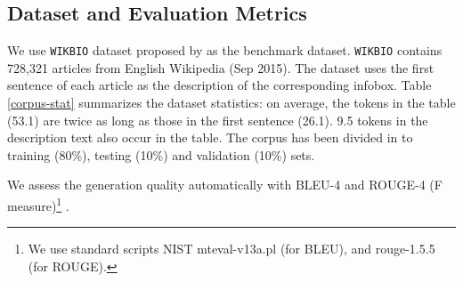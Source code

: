 \documentclass[letterpaper]{article} %
\begin{document}
\subsection{Dataset and Evaluation Metrics}
We use  \texttt{WIKBIO} dataset proposed by \citeauthor{lebret2016neural}  as the benchmark dataset. \texttt{WIKBIO} contains 728,321 articles from English Wikipedia (Sep 2015). The dataset uses the first sentence of each article as the description of the corresponding infobox. Table \ref{corpus-stat} summarizes the dataset statistics: on average, the tokens in the table (53.1) are twice as long as those in the first sentence (26.1). 9.5 tokens in the description text also occur in the table. The corpus has been divided in to training (80\%), testing (10\%) and validation (10\%) sets. 

We assess the generation quality automatically with BLEU-4 and ROUGE-4 (F measure)\footnote{We use standard scripts NIST mteval-v13a.pl (for BLEU), and rouge-1.5.5 (for ROUGE).} .    
\end{document}
